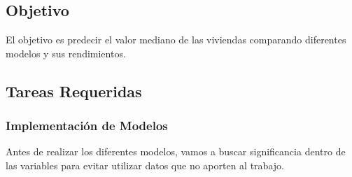 \documentclass[12pt,a4paper]{article}
\begin{document}
\subsection{Objetivo}

El objetivo es predecir el valor mediano de las viviendas comparando diferentes modelos y sus rendimientos.

\subsection{Tareas Requeridas}

\subsubsection{Implementación de Modelos}

Antes de realizar los diferentes modelos, vamos a buscar significancia dentro de las variables para evitar utilizar datos que no aporten al trabajo.
\end{document}
